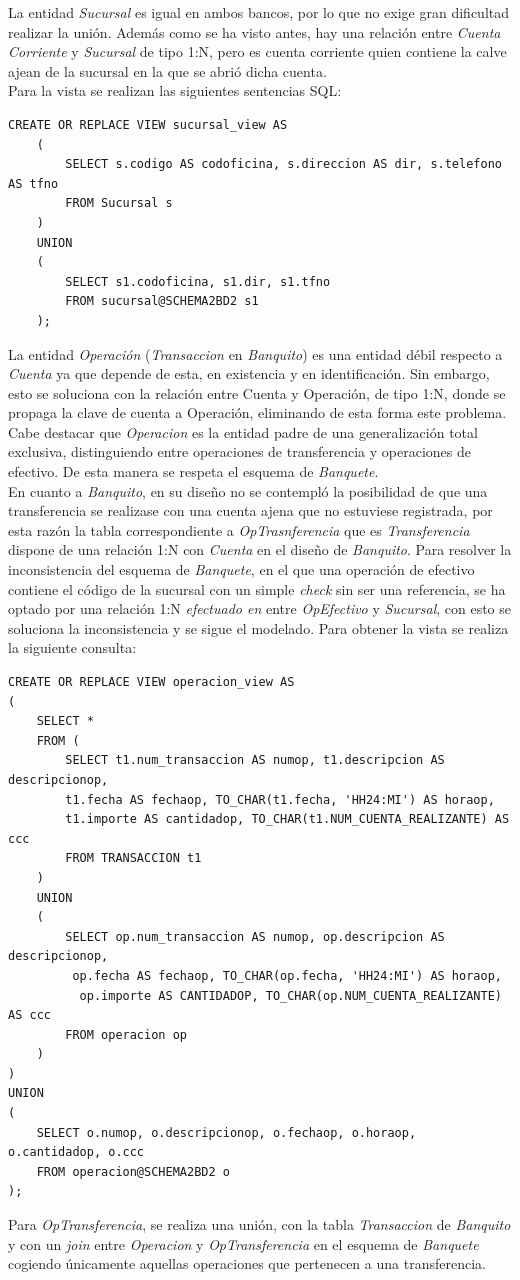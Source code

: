 \documentclass{article}
\begin{document}
La entidad \textit{Sucursal} es igual en ambos bancos, por lo que no exige gran dificultad realizar la unión. 
Además como se ha visto antes, hay una relación entre \textit{Cuenta Corriente} y \textit{Sucursal} de tipo 1:N, pero es cuenta corriente quien contiene la calve ajean de la sucursal en la que se abrió dicha cuenta.\\
Para la vista se realizan las siguientes sentencias SQL:
\begin{lstlisting}
CREATE OR REPLACE VIEW sucursal_view AS 
	(
		SELECT s.codigo AS codoficina, s.direccion AS dir, s.telefono AS tfno
		FROM Sucursal s
	)
	UNION
	(
		SELECT s1.codoficina, s1.dir, s1.tfno
		FROM sucursal@SCHEMA2BD2 s1
	);
\end{lstlisting}
La entidad \textit{Operación} (\textit{Transaccion} en \emph{Banquito}) es una entidad débil respecto a \textit{Cuenta} ya que depende de esta, en existencia y en identificación. Sin embargo, esto se soluciona con la relación entre Cuenta y Operación, de tipo 1:N, donde se propaga la clave de cuenta a Operación, eliminando de esta forma este problema. Cabe destacar que \textit{Operacion} es la entidad padre de una generalización total exclusiva, distinguiendo entre operaciones de transferencia y operaciones de efectivo. De esta manera se respeta el esquema de \emph{Banquete}. \\
En cuanto a \emph{Banquito}, en su diseño no se contempló la posibilidad de que una transferencia se realizase con una cuenta ajena que no estuviese registrada, por esta razón la tabla correspondiente a \textit{OpTrasnferencia} que es \textit{Transferencia} dispone de una relación 1:N con \textit{Cuenta} en el diseño de \emph{Banquito}. 
Para resolver la inconsistencia del esquema de \emph{Banquete}, en el que una operación de efectivo contiene el código de la sucursal con un simple \textit{check} sin ser una referencia, se ha optado por una relación 1:N \textit{efectuado en } entre \textit{OpEfectivo} y \textit{Sucursal}, con esto se soluciona la inconsistencia y se sigue el modelado.
Para obtener la vista se realiza la siguiente consulta:

\begin{lstlisting}
CREATE OR REPLACE VIEW operacion_view AS
(
	SELECT *
	FROM (
		SELECT t1.num_transaccion AS numop, t1.descripcion AS descripcionop, 
		t1.fecha AS fechaop, TO_CHAR(t1.fecha, 'HH24:MI') AS horaop, 
		t1.importe AS cantidadop, TO_CHAR(t1.NUM_CUENTA_REALIZANTE) AS ccc
		FROM TRANSACCION t1
	)
	UNION
	(
		SELECT op.num_transaccion AS numop, op.descripcion AS descripcionop,
		 op.fecha AS fechaop, TO_CHAR(op.fecha, 'HH24:MI') AS horaop,
		  op.importe AS CANTIDADOP, TO_CHAR(op.NUM_CUENTA_REALIZANTE) AS ccc
		FROM operacion op
	)
)
UNION
(
	SELECT o.numop, o.descripcionop, o.fechaop, o.horaop, o.cantidadop, o.ccc
	FROM operacion@SCHEMA2BD2 o
);
\end{lstlisting}
Para \textit{OpTransferencia}, se realiza una unión, con la tabla \textit{Transaccion} de \emph{Banquito} y con un \textit{join} entre \textit{Operacion} y \textit{OpTransferencia}  en el esquema de \emph{Banquete} cogiendo únicamente aquellas operaciones que pertenecen a una transferencia.
\end{document}
